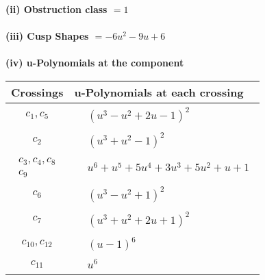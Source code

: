 \documentclass[1p]{elsarticle_modified}
\theoremstyle{definition}
\begin{document}
\flushleft \textbf{(ii) Obstruction class $= 1$}\\~\\
\flushleft \textbf{(iii) Cusp Shapes $= -6 u^2-9 u+6$}\\~\\
\newpage\renewcommand{\arraystretch}{1}
\flushleft \textbf{(iv) u-Polynomials at the component}\newline \\
\begin{tabular}{m{50pt}|m{274pt}}
Crossings & \hspace{64pt}u-Polynomials at each crossing \\
\hline $$\begin{aligned}c_{1},c_{5}\end{aligned}$$&$\begin{aligned}
&(u^3- u^2+2 u-1)^2
\end{aligned}$\\
\hline $$\begin{aligned}c_{2}\end{aligned}$$&$\begin{aligned}
&(u^3+u^2-1)^2
\end{aligned}$\\
\hline $$\begin{aligned}c_{3},c_{4},c_{8}\\c_{9}\end{aligned}$$&$\begin{aligned}
&u^6+u^5+5 u^4+3 u^3+5 u^2+u+1
\end{aligned}$\\
\hline $$\begin{aligned}c_{6}\end{aligned}$$&$\begin{aligned}
&(u^3- u^2+1)^2
\end{aligned}$\\
\hline $$\begin{aligned}c_{7}\end{aligned}$$&$\begin{aligned}
&(u^3+u^2+2 u+1)^2
\end{aligned}$\\
\hline $$\begin{aligned}c_{10},c_{12}\end{aligned}$$&$\begin{aligned}
&(u-1)^6
\end{aligned}$\\
\hline $$\begin{aligned}c_{11}\end{aligned}$$&$\begin{aligned}
&u^6
\end{aligned}$\\
\hline
\end{tabular}\\~\\
\end{document}
